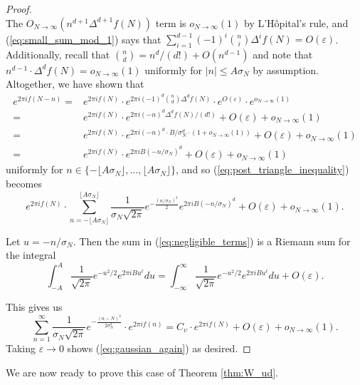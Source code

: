 \documentclass[12pt]{article}
\theoremstyle{plain} %
\theoremstyle{definition} %
\theoremstyle{plain}
\theoremstyle{plain}
\numberwithin{equation}{section}
\renewcommand{\epsilon}{\varepsilon}
\renewcommand{\leq}{\leqslant}
\newcommand{\1}{\mathbbm{1}}
\newcommand{\oo}{\infty}
\begin{document}
\begin{proof}
\[\]
The $O_{N\to\oo}({n^{d+1}\Delta^{d+1}f(N)})$ term is $o_{N\to\oo}(1)$ by L'H\^opital's rule, and (\ref{eq:small_sum_mod_1}) says that  $\sum_{i=1}^{d-1} (-1)^i\binom{n}{i}\Delta^{i}f(N)=O(\epsilon)$. Additionally, recall that $\binom{n}{d} = n^{d}/(d!)+O(n^{d-1})$ and note that $n^{d-1}\cdot \Delta^{d}f(N) = o_{N\to\oo}(1)$ uniformly for $|n|\leq A\sigma_N$ by assumption. Altogether, we have shown that 
\begin{align*}
    e^{2\pi i f(N-n)} =&e^{2\pi i f(N)}\cdot e^{2\pi i (-1)^{d}\binom{n}{d}\Delta^{d}f(N)}\cdot e^{O(\epsilon)}\cdot e^{o_{N\to\oo}(1)}\\
   =& e^{2\pi i f(N)}\cdot e^{2\pi i (-n)^{d}\Delta^{d}f(N)/(d!)}+O(\epsilon) +o_{N\to\oo}(1)\\
    =& e^{2\pi i f(N)}\cdot e^{2\pi i (-n)^{d}\cdot B/\sigma_N^{d}\cdot (1+o_{N\to\oo}(1))}+O(\epsilon) +o_{N\to\oo}(1)\\
    =&e^{2\pi i f(N)}\cdot e^{2\pi i B(-n/\sigma_N)^{d}}+O(\epsilon) +o_{N\to\oo}(1)
\end{align*}
uniformly for $n\in \{-\lfloor A\sigma_N\rfloor,\dots, \lfloor A\sigma_N\rfloor\}$, and so (\ref{eq:post_triangle_inequality}) becomes
\begin{equation}\label{eq:negligible_terms}
e^{2\pi i f(N)}\cdot\sum_{n=-\lfloor{A\sigma_N\rfloor}}^{\lfloor  A \sigma_N\rfloor}\frac{1}{\sigma_N\sqrt{2\pi}}e^{-\frac{(n/\sigma_N)^2}{2}}e^{2\pi i B(-n/\sigma_N)^{d}}+O(\epsilon)+o_{N\to\oo}(1).
\end{equation}

Let $u = -n/\sigma_N$. Then the sum in (\ref{eq:negligible_terms}) is a Riemann sum for the integral 
\[
\int_{-A}^A \frac{1}{\sqrt{2\pi}}e^{-u^2/2}e^{2\pi i Bu^{\ell}}du= \int_{-\oo}^{\oo} \frac{1}{\sqrt{2\pi}}e^{-u^2/2}e^{2\pi i Bu^{\ell}}du+O(\epsilon).
\]

This gives us 
\[
    \sum_{n=1}^{\oo}\frac{1}{\sigma_N\sqrt{2\pi}}e^{-\frac{(n-N)^2}{2\sigma_N^2}}\cdot e^{2\pi i f(n)} = C_{\upsilon}\cdot e^{2\pi i f(N)}+O(\epsilon)+o_{N\to\oo}(1).
\]
Taking $\epsilon\to 0$ shows (\ref{eq:gaussian_again}) as desired.
\end{proof}

We are now ready to prove this case of Theorem \ref{thm:W_ud}.
\end{document}
